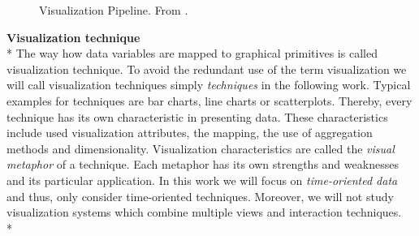 \begin{figure}[H]
    \centering
    \caption{Visualization Pipeline. From \cite{Ware2012a}.}
    \label{fig:my_label}
\end{figure}

\textbf{Visualization technique}\\*
The way how data variables are mapped to graphical primitives is called visualization technique. To avoid the redundant use of the term visualization we will call visualization techniques simply \textit{techniques} in the following work. Typical examples for techniques are bar charts, line charts or scatterplots. Thereby, every technique has its own characteristic in presenting data. These characteristics include used visualization attributes, the mapping, the use of aggregation methods and dimensionality. Visualization characteristics are called the \textit{visual metaphor} of a technique\cite{Tegarden1999}. Each metaphor has its own strengths and weaknesses and its particular application. In this work we will focus on \textit{time-oriented data} and thus, only consider time-oriented techniques. Moreover, we will not study visualization systems which combine multiple views and interaction techniques.\\*
